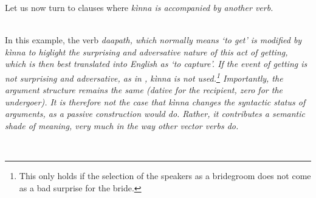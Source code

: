  

% 

 
Let us now turn to clauses where \em kìnna \em is accompanied by another verb.

\\ 

In this example, the verb \em daapath\em, which normally means `to get' is modified by \em kìnna \em to higlight the surprising and adversative nature of this act of getting, which is then best translated into English as  `to capture'. If the event of getting is not surprising and adversative, as in , \em kìnna \em is not used.\footnote{This only holds if the selection of the speakers as a bridegroom does not come as a bad surprise for the bride.} Importantly, the argument structure remains the same (dative for the recipient, zero for the undergoer). It is therefore not the case that \em kìnna \em changes the syntactic status of arguments, as a passive construction would do. Rather, it contributes a semantic shade of meaning, very much in the way other vector verbs do.

 \\

 
 
